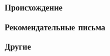 \label{ListOfExhibits}

\textbf{\Large Происхождение}
{\small{}}

\textbf{\Large Рекомендательные письма}
{\small{}}

\textbf{\Large Другие}
{\small{}}

\pagebreak
